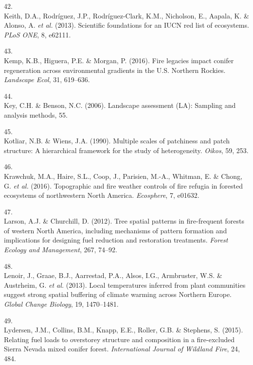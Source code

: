 \documentclass[]{article}
\begin{document}
\leavevmode\hypertarget{ref-keith2013}{}%
42.\\
Keith, D.A., Rodríguez, J.P., Rodríguez-Clark, K.M., Nicholson, E.,
Aapala, K. \& Alonso, A. \emph{et al.} (2013). Scientific foundations
for an IUCN red list of ecosystems. \emph{PLoS ONE}, 8, e62111.

\leavevmode\hypertarget{ref-kemp2016}{}%
43.\\
Kemp, K.B., Higuera, P.E. \& Morgan, P. (2016). Fire legacies impact
conifer regeneration across environmental gradients in the U.S. Northern
Rockies. \emph{Landscape Ecol}, 31, 619--636.

\leavevmode\hypertarget{ref-key2006}{}%
44.\\
Key, C.H. \& Benson, N.C. (2006). Landscape assessment (LA): Sampling
and analysis methods, 55.

\leavevmode\hypertarget{ref-kotliar1990}{}%
45.\\
Kotliar, N.B. \& Wiens, J.A. (1990). Multiple scales of patchiness and
patch structure: A hierarchical framework for the study of
heterogeneity. \emph{Oikos}, 59, 253.

\leavevmode\hypertarget{ref-krawchuk2016}{}%
46.\\
Krawchuk, M.A., Haire, S.L., Coop, J., Parisien, M.-A., Whitman, E. \&
Chong, G. \emph{et al.} (2016). Topographic and fire weather controls of
fire refugia in forested ecosystems of northwestern North America.
\emph{Ecosphere}, 7, e01632.

\leavevmode\hypertarget{ref-larson2012}{}%
47.\\
Larson, A.J. \& Churchill, D. (2012). Tree spatial patterns in
fire-frequent forests of western North America, including mechanisms of
pattern formation and implications for designing fuel reduction and
restoration treatments. \emph{Forest Ecology and Management}, 267,
74--92.

\leavevmode\hypertarget{ref-lenoir2013}{}%
48.\\
Lenoir, J., Graae, B.J., Aarrestad, P.A., Alsos, I.G., Armbruster, W.S.
\& Austrheim, G. \emph{et al.} (2013). Local temperatures inferred from
plant communities suggest strong spatial buffering of climate warming
across Northern Europe. \emph{Global Change Biology}, 19, 1470--1481.

\leavevmode\hypertarget{ref-lydersen2015}{}%
49.\\
Lydersen, J.M., Collins, B.M., Knapp, E.E., Roller, G.B. \& Stephens, S.
(2015). Relating fuel loads to overstorey structure and composition in a
fire-excluded Sierra Nevada mixed conifer forest. \emph{International
Journal of Wildland Fire}, 24, 484.
\end{document}

